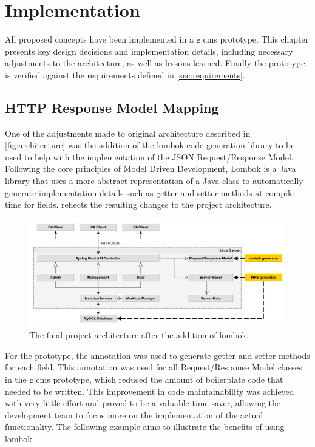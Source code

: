 \chapter{Implementation}
\label{ch:impl}


All proposed concepts have been implemented in a \gls{g:cms} prototype. This chapter presents key design decisions and implementation details, including necessary adjustments to the architecture, as well as lessons learned. Finally the prototype is verified against the requirements defined in \cref{sec:requirements}. 

\section{HTTP Response Model Mapping}\label{sec:impl-lombok}

One of the adjustments made to original architecture described in \vref{fig:architecture} was the addition of the lombok code generation library to be used to help with the implementation of the JSON Request/Response Model. Following the core principles of Model Driven Development, Lombok is a Java library that uses a more abstract representation of a Java class to automatically generate implementation-details such as getter and setter methods at compile time for fields.  reflects the resulting changes to the project architecture.

\begin{figure}[H]
    \centering
    \includegraphics[width=\textwidth]{images/big-picture}
    \caption{The final project architecture after the addition of lombok.}
    \label{fig:architecture-with-lombok}
\end{figure}

For the prototype, the  annotation was used to generate getter and setter methods for each field. This annotation was used for all Request/Response Model classes in the \gls{g:cms} prototype, which reduced the amount of boilerplate code that needed to be written. This improvement in code maintainability was achieved with very little effort and proved to be a valuable time-saver, allowing the development team to focus more on the implementation of the actual functionality. The following example aims to illustrate the benefits of using lombok.

